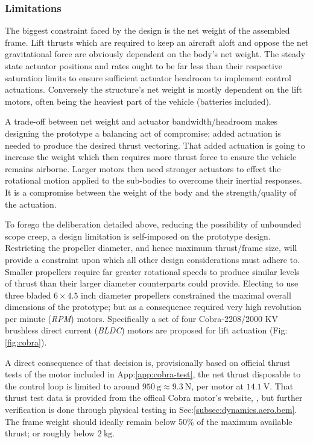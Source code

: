 \subsubsection{Limitations}
\label{subsubsec:intro.foreword.limits}
The biggest constraint faced by the design is the net weight of the assembled frame. Lift thrusts which are required to keep an aircraft aloft and oppose the net gravitational force are obviously dependent on the body's net weight. The steady state actuator positions and rates ought to be far less than their respective saturation limits to ensure sufficient actuator headroom to implement control actuations. Conversely the structure's net weight is mostly dependent on the lift motors, often being the heaviest part of the vehicle (batteries included). 
\par
A trade-off between net weight and actuator bandwidth/headroom makes designing the prototype a balancing act of compromise; added actuation is needed to produce the desired thrust vectoring. That added actuation is going to increase the weight which then requires more thrust force to ensure the vehicle remains airborne. Larger motors then need stronger actuators to effect the rotational motion applied to the sub-bodies to overcome their inertial responses. It is a compromise between the weight of the body and the strength/quality of the actuation.
\par
To forego the deliberation detailed above, reducing the possibility of unbounded scope creep, a design limitation is self-imposed on the prototype design. Restricting the propeller diameter, and hence maximum thrust/frame size, will provide a constraint upon which all other design considerations must adhere to. Smaller propellers require far greater rotational speeds to produce similar levels of thrust than their larger diameter counterparts could provide. Electing to use three bladed $6\times 4.5$ inch diameter propellers constrained the maximal overall dimensions of the prototype; but as a consequence required very high revolution per minute (\emph{RPM}) motors. Specifically a set of four Cobra-2208/2000 KV \cite{cobramotor} brushless direct current (\emph{BLDC}) motors are proposed for lift actuation (Fig:\ref{fig:cobra}). 
\par
A direct consequence of that decision is, provisionally based on official thrust tests of the motor included in App:\ref{app:cobra-test}, the net thrust disposable to the control loop is limited to around $950~\text{g}\approx 9.3~\text{N}$, per motor at $14.1~\text{V}$. That thrust test data is provided from the offical Cobra motor's website, \cite{cobramotor}, but further verification is done through physical testing in Sec:\ref{subsec:dynamics.aero.bem}. The frame weight should ideally remain below 50\% of the maximum available thrust; or roughly below $2~\text{kg}$.
